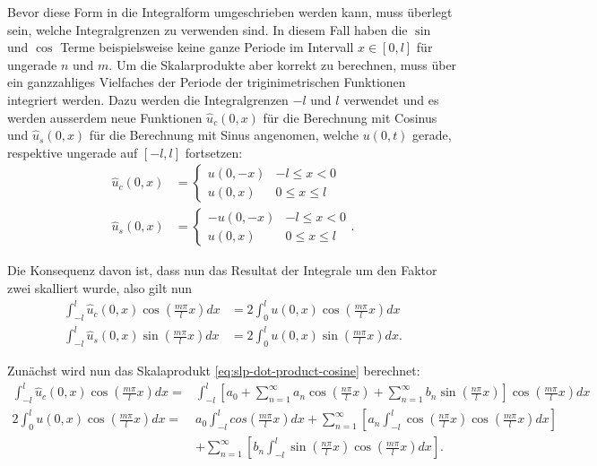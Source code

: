 Bevor diese Form in die Integralform umgeschrieben werden kann, muss überlegt
sein, welche Integralgrenzen zu verwenden sind.
In diesem Fall haben die $ \sin $ und $ \cos $ Terme beispielsweise keine ganze
Periode im Intervall $ x \in [0, l] $ für ungerade $ n $ und $ m $.
Um die Skalarprodukte aber korrekt zu berechnen, muss über ein ganzzahliges
Vielfaches der Periode der triginimetrischen Funktionen integriert werden.
Dazu werden die Integralgrenzen $-l$ und $l$ verwendet und es werden ausserdem
neue Funktionen $ \hat{u}_c(0, x) $ für die Berechnung mit Cosinus und
$ \hat{u}_s(0, x) $ für die Berechnung mit Sinus angenomen, welche $ u(0, t) $
gerade, respektive ungerade auf $[-l, l]$ fortsetzen:
\[
\begin{aligned}
    \hat{u}_c(0, x)
    &=
    \begin{cases}
        u(0, -x) & -l \leq x < 0
        \\
        u(0, x) & 0 \leq x \leq l
    \end{cases}
    \\
    \hat{u}_s(0, x)
    &=
    \begin{cases}
        -u(0, -x) & -l \leq x < 0
        \\
        u(0, x) & 0 \leq x \leq l
    \end{cases}.
\end{aligned}
\]

Die Konsequenz davon ist, dass nun das Resultat der Integrale um den Faktor zwei
skalliert wurde, also gilt nun
\[
\begin{aligned}
    \int_{-l}^{l}\hat{u}_c(0, x)\cos\left(\frac{m \pi}{l}x\right)dx
    &=
    2\int_{0}^{l}u(0, x)\cos\left(\frac{m \pi}{l}x\right)dx
    \\
    \int_{-l}^{l}\hat{u}_s(0, x)\sin\left(\frac{m \pi}{l}x\right)dx
    &=
    2\int_{0}^{l}u(0, x)\sin\left(\frac{m \pi}{l}x\right)dx.
\end{aligned}
\]

Zunächst wird nun das Skalaprodukt \eqref{eq:slp-dot-product-cosine} berechnet:
\[
\begin{aligned}
    \int_{-l}^{l}\hat{u}_c(0, x)\cos\left(\frac{m \pi}{l}x\right)dx
    =&
    \int_{-l}^{l} \left[a_0
    +
    \sum_{n = 1}^{\infty} a_n\cos\left(\frac{n\pi}{l}x\right)
    +
    \sum_{n = 1}^{\infty} b_n\sin\left(\frac{n\pi}{l}x\right)\right]
    \cos\left(\frac{m \pi}{l}x\right) dx
    \\
    2\int_{0}^{l}u(0, x)\cos\left(\frac{m \pi}{l}x\right)dx
    =&
    a_0 \int_{-l}^{l}cos\left(\frac{m \pi}{l}x\right) dx
    +
    \sum_{n = 1}^{\infty}\left[a_n\int_{-l}^{l}\cos\left(\frac{n\pi}{l}x\right)
        \cos\left(\frac{m \pi}{l}x\right)dx\right]
    \\
    &+
    \sum_{n = 1}^{\infty}\left[b_n\int_{-l}^{l}\sin\left(\frac{n\pi}{l}x\right)
        \cos\left(\frac{m \pi}{l}x\right)dx\right].
\end{aligned}
\]

